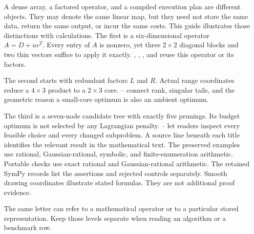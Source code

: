 A dense array, a factored operator, and a compiled execution plan are different objects. They may denote the same linear map, but they need not store the same data, return the same output, or incur the same costs. This guide illustrates those distinctions with calculations.
The first is a six-dimensional operator $A=D+uv^T$. Every entry of $A$ is nonzero, yet three $2\times2$ diagonal blocks and two thin vectors suffice to apply it exactly. , , , and  reuse this operator or its factors.

The second starts with redundant factors $L$ and $R$. Actual range coordinates reduce a $4\times3$ product to a $2\times3$ core. -- connect rank, singular tails, and the geometric reason a small-core optimum is also an ambient optimum.

The third is a seven-node candidate tree with exactly five prunings. Its budget optimum is not selected by any Lagrangian penalty. -- let readers inspect every feasible choice and every changed subproblem.
A source line beneath each title identifies the relevant result in the mathematical text. The preserved examples use rational, Gaussian-rational, symbolic, and finite-enumeration arithmetic. Portable checks use exact rational and Gaussian-rational arithmetic. The retained SymPy records list the assertions and rejected controls separately. Smooth drawing coordinates illustrate stated formulas. They are not additional proof evidence.

The same letter can refer to a mathematical operator or to a particular stored representation. Keep those levels separate when reading an algorithm or a benchmark row.

